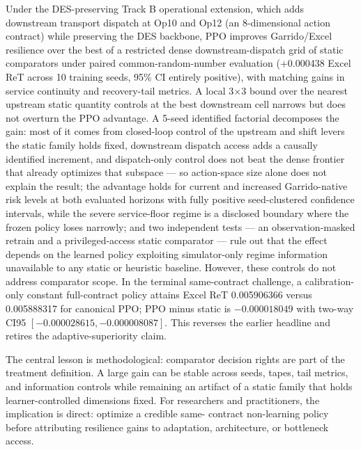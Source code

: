 Under the DES-preserving Track B operational extension, which adds downstream transport
dispatch at Op10 and Op12 (an 8-dimensional action contract) while
preserving the DES backbone, PPO improves Garrido/Excel resilience over
the best of a restricted dense downstream-dispatch grid of static comparators under paired
common-random-number evaluation (+0.000438 Excel ReT across 10 training
seeds, 95\% CI entirely positive),
with matching gains in service continuity and recovery-tail metrics. A
local 3$\times$3 bound over the nearest upstream static quantity controls
at the best downstream cell narrows but does not overturn the PPO
advantage. A
5-seed identified factorial decomposes the gain: most of it comes from
closed-loop control of the upstream and shift levers the static family
holds fixed, downstream dispatch access adds a causally identified
increment, and dispatch-only control does not beat the dense frontier
that already optimizes that subspace --- so action-space size alone does
not explain the result; the
advantage holds for current and increased Garrido-native risk levels at
both evaluated horizons with fully positive seed-clustered confidence
intervals, while the severe service-floor regime is a disclosed boundary
where the frozen policy loses narrowly; and two
independent tests --- an observation-masked retrain and a
privileged-access static comparator --- rule out that the effect depends
on the learned policy exploiting simulator-only regime information
unavailable to any static or heuristic baseline. However, these controls do
not address comparator scope. In the terminal same-contract challenge, a
calibration-only constant full-contract policy attains Excel ReT 0.005906366
versus 0.005888317 for canonical PPO; PPO minus static is $-0.000018049$
with two-way CI95 $[-0.000028615,-0.000008087]$. This reverses the earlier
headline and retires the adaptive-superiority claim.

The central lesson is methodological: comparator decision rights are part of
the treatment definition. A large gain can be stable across seeds, tapes,
tail metrics, and information controls while remaining an artifact of a
static family that holds learner-controlled dimensions fixed. For researchers
and practitioners, the implication is direct: optimize a credible same-
contract non-learning policy before attributing resilience gains to
adaptation, architecture, or bottleneck access.
